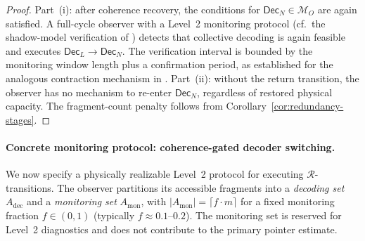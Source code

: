 \documentclass[11pt]{article}
\newcommand{\1}{\mathbf{1}}
\theoremstyle{definition}
\theoremstyle{plain}
\begin{document}
\begin{proof}
Part~(i): after coherence recovery, the conditions for
$\mathsf{Dec}_N\in\mathcal{M}_O$ are again satisfied.
A full-cycle observer with a Level~2 monitoring protocol
(cf.\ the shadow-model verification of
\citep[Sec.~5.1]{WuDLNCompression2026preprint}) detects that collective
decoding is again feasible and executes
$\mathsf{Dec}_L\to\mathsf{Dec}_N$.
The verification interval is bounded by the monitoring window length plus
a confirmation period, as established for the analogous contraction
mechanism in
\citep[Proposition~1(iii)]{WuDLNCompression2026preprint}.
Part~(ii): without the return transition, the observer has no mechanism
to re-enter $\mathsf{Dec}_N$, regardless of restored physical capacity.
The fragment-count penalty follows from
Corollary~\ref{cor:redundancy-stages}.
\end{proof}


\paragraph{Concrete monitoring protocol: coherence-gated decoder switching.}
\label{par:monitoring-protocol}
We now specify a physically realizable Level~2 protocol for executing
$\mathcal{R}$-transitions.
The observer partitions its accessible fragments into a \emph{decoding
set} $A_{\mathrm{dec}}$ and a \emph{monitoring set}
$A_{\mathrm{mon}}$, with $|A_{\mathrm{mon}}|=\lceil f\cdot m\rceil$
for a fixed monitoring fraction $f\in(0,1)$ (typically $f\approx 0.1$--$0.2$).
The monitoring set is reserved for Level~2 diagnostics and does not
contribute to the primary pointer estimate.
\end{document}
